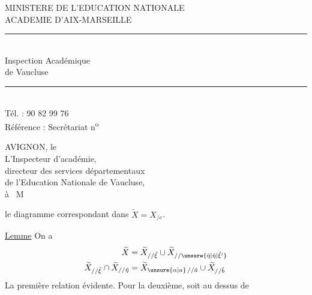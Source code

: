MINISTERE DE L'EDUCATION NATIONALE\\
ACADEMIE D'AIX-MARSEILLE\\
\rule{2cm}{0.4pt}\\
Inspection Académique\\
de Vaucluse\\
\rule{2cm}{0.4pt}\\
Tél. : 90 82 99 76\\
Référence : Secrétariat n\textsuperscript{o}

AVIGNON, le\\[1ex]
L'Inspecteur d'académie,\\
directeur des services départementaux\\
de l'Education Nationale de Vaucluse,\\[1ex]
à \ M

le diagramme correspondant dans $\widetilde X=X_{/e}$.

\uline{Lemme} On a 
\[
\begin{aligned}
 \widetilde X&=\widetilde X_{//\tilde\xi}\cup\widetilde X_{//\unsure{\bar\eta|\tilde\eta|\tilde\xi'}}\\
 \widetilde X_{//\tilde\xi}\cap\widetilde X_{//\tilde\eta}
 &=\widetilde X_{\unsure{\alpha|a}\,//\tilde a}\cup\widetilde X_{//\tilde b}
\end{aligned}
\]
La première relation évidente. Pour la deuxième, soit
au dessus de

